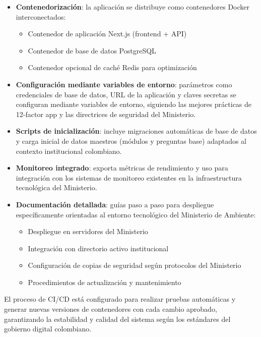 \documentclass[12pt,a4paper]{report}
\begin{document}
\begin{itemize}[leftmargin=*]
    \item \textbf{Contenedorización}: la aplicación se distribuye como contenedores Docker interconectados:
    \begin{itemize}
        \item Contenedor de aplicación Next.js (frontend + API)
        \item Contenedor de base de datos PostgreSQL
        \item Contenedor opcional de caché Redis para optimización
    \end{itemize}
    
    \item \textbf{Configuración mediante variables de entorno}: parámetros como credenciales de base de datos, URL de la aplicación y claves secretas se configuran mediante variables de entorno, siguiendo las mejores prácticas de 12-factor app y las directrices de seguridad del Ministerio.
    
    \item \textbf{Scripts de inicialización}: incluye migraciones automáticas de base de datos y carga inicial de datos maestros (módulos y preguntas base) adaptados al contexto institucional colombiano.
    
    \item \textbf{Monitoreo integrado}: exporta métricas de rendimiento y uso para integración con los sistemas de monitoreo existentes en la infraestructura tecnológica del Ministerio.
    
    \item \textbf{Documentación detallada}: guías paso a paso para despliegue específicamente orientadas al entorno tecnológico del Ministerio de Ambiente:
    \begin{itemize}
        \item Despliegue en servidores del Ministerio
        \item Integración con directorio activo institucional
        \item Configuración de copias de seguridad según protocolos del Ministerio
        \item Procedimientos de actualización y mantenimiento
    \end{itemize}
\end{itemize}

El proceso de CI/CD está configurado para realizar pruebas automáticas y generar nuevas versiones de contenedores con cada cambio aprobado, garantizando la estabilidad y calidad del sistema según los estándares del gobierno digital colombiano.
\end{document}
